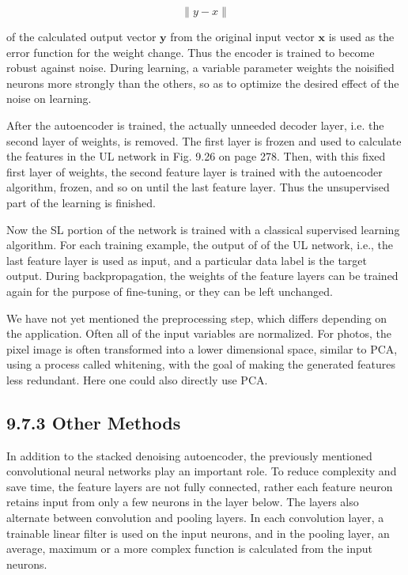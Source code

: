 \documentclass[10pt]{article}
\begin{document}
$$
\|y-x\|
$$

of the calculated output vector $\boldsymbol{y}$ from the original input vector $\boldsymbol{x}$ is used as the error function for the weight change. Thus the encoder is trained to become robust against noise. During learning, a variable parameter weights the noisified neurons more strongly than the others, so as to optimize the desired effect of the noise on learning.

After the autoencoder is trained, the actually unneeded decoder layer, i.e. the second layer of weights, is removed. The first layer is frozen and used to calculate the features in the UL network in Fig. 9.26 on page 278. Then, with this fixed first layer of weights, the second feature layer is trained with the autoencoder algorithm, frozen, and so on until the last feature layer. Thus the unsupervised part of the learning is finished.

Now the SL portion of the network is trained with a classical supervised learning algorithm. For each training example, the output of of the UL network, i.e., the last feature layer is used as input, and a particular data label is the target output. During backpropagation, the weights of the feature layers can be trained again for the purpose of fine-tuning, or they can be left unchanged.

We have not yet mentioned the preprocessing step, which differs depending on the application. Often all of the input variables are normalized. For photos, the pixel image is often transformed into a lower dimensional space, similar to PCA, using a process called whitening, with the goal of making the generated features less redundant. Here one could also directly use PCA.

\subsection*{9.7.3 Other Methods}
In addition to the stacked denoising autoencoder, the previously mentioned convolutional neural networks play an important role. To reduce complexity and save time, the feature layers are not fully connected, rather each feature neuron retains input from only a few neurons in the layer below. The layers also alternate between convolution and pooling layers. In each convolution layer, a trainable linear filter is used on the input neurons, and in the pooling layer, an average, maximum or a more complex function is calculated from the input neurons.
\end{document}
